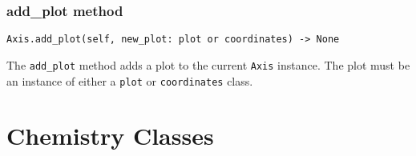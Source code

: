 \documentclass{article}
\begin{document}
\subsubsection[add\_plot method]{add\_plot method}
\begin{lstlisting}
Axis.add_plot(self, new_plot: plot or coordinates) -> None
\end{lstlisting}
The \verb|add_plot| method adds a plot to the current \verb|Axis| instance. The plot must be an instance of either a \verb|plot| or \verb|coordinates| class.
\section[Chemistry Classes]{Chemistry Classes}
\end{document}
